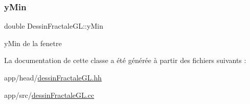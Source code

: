 \subsubsection{\texorpdfstring{y\+Min}{yMin}}
{\footnotesize\ttfamily double Dessin\+Fractale\+G\+L\+::y\+Min\hspace{0.3cm}{\ttfamily [private]}}

y\+Min de la fenetre 

La documentation de cette classe a été générée à partir des fichiers suivants \+:\begin{DoxyCompactItemize}
\item 
app/head/\hyperlink{dessinFractaleGL_8hh}{dessin\+Fractale\+G\+L.\+hh}\item 
app/src/\hyperlink{dessinFractaleGL_8cc}{dessin\+Fractale\+G\+L.\+cc}\end{DoxyCompactItemize}
